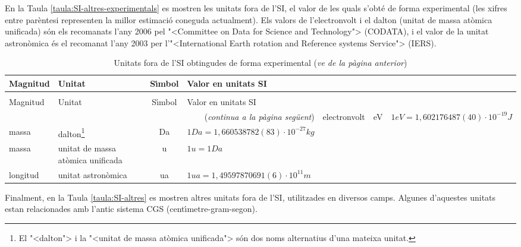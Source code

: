 En la Taula \vref{taula:SI-altres-experimentals} es mostren les unitats fora de l'SI, el valor de les quals s'obt\'{e} de forma experimental (les xifres entre par\`{e}ntesi representen la millor estimaci\'{o} coneguda actualment). Els valors de l'electronvolt i el dalton (unitat de massa at\`{o}mica unificada) s\'{o}n els recomanats
l'any 2006 pel {"<}Committee on Data for Science and Technology{">} (\textsf{CODATA}), i el valor de la unitat astron\`{o}mica \'{e}s el recomanat l'any 2003 per l'{"<}International Earth rotation and Reference systems Service{">} (\textsf{IERS}).

\begin{longtable}[h]{llcl}
   \caption{\label{taula:SI-altres-experimentals} Unitats fora de l'SI obtingudes de forma experimental }\\
   \toprule[1pt]
    Magnitud & Unitat &  S\'{\i}mbol & Valor en unitats SI\\
   \midrule
   \endfirsthead
   \caption[]{Unitats fora de l'SI obtingudes de forma experimental (\emph{ve de la p\`{a}gina
   anterior})}\\
   \toprule[1pt]
    Magnitud & Unitat &  S\'{\i}mbol & Valor en unitats SI\\
   \midrule
   \endhead
   \midrule
   \multicolumn{4}{r}{(\emph{continua a la p\`{a}gina seg\"{u}ent})}
   \endfoot
   \endlastfoot
   energia & electronvolt & \unit{eV} & $1\unit{eV} = 1{,}602176487(40)\cdot 10^{-19}\unit{J}$ \\
   massa & dalton\footnote{El {"<}dalton{">} i la {"<}unitat de massa at\`{o}mica unificada{">} s\'{o}n dos noms alternatius d'una mateixa unitat.}& Da & $1\unit{Da} = 1{,}660538782(83)\cdot 10^{-27}\unit{kg}$\\
   massa & unitat de massa at\`{o}mica unificada & u & $1\unit{u} = 1\unit{Da}$  \\
   longitud & unitat astron\`{o}mica &  \unit{ua }& $1\unit{ua} =  1{,}49597870691(6)\cdot 10^{11}\unit{m}$ \\
\bottomrule[1pt]
\end{longtable}


Finalment, en la Taula \vref{taula:SI-altres} es mostren altres unitats fora de l'SI, utilitzades en diversos camps. Algunes d'aquestes unitats estan relacionades amb l'antic sistema CGS (cent\'{\i}metre-gram-segon).

